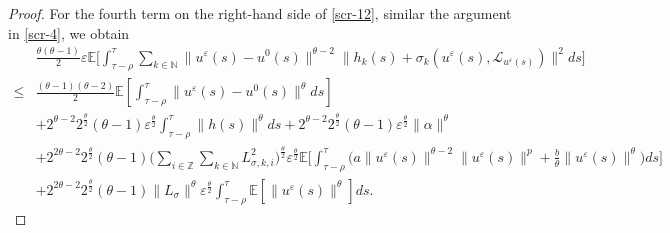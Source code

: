 \documentclass[11pt]{article}
\numberwithin{equation}{section}
\theoremstyle{plain}
\begin{document}
\begin{proof}
 For the fourth term on the right-hand side of \eqref{scr-12},
 similar the argument in \eqref{scr-4}, we obtain
 \begin{align}\label{scr-15}  
       & \frac{\theta(\theta - 1)}{2} \varepsilon \mathbb{E}
                  \bigg[ \int_{\tau-\rho}^{\tau} 
                              \sum_{k \in \mathbb{N} }
                                     \| u^{\varepsilon}(s) - u^0(s) \|^{\theta - 2}
                                     \| h_k(s) + \sigma_k(u^{\varepsilon}(s), \mathcal{L}_{u^{\varepsilon}(s)}) \|^2 ds
                  \bigg]  \nonumber\\ 
    \le & \frac{(\theta - 1)(\theta - 2)}{2}
                  \mathbb{E}
                         \left[ \int_{\tau-\rho}^{\tau} 
                                      \| u^{\varepsilon}(s) - u^0(s) \|^\theta
                                  ds
                         \right]  \nonumber\\   
         & + 2^{\theta -2} 2^{\frac{\theta}{2} } (\theta - 1) 
                   \varepsilon^{\frac{\theta}{2} } 
                      \int_{\tau-\rho}^{\tau} 
                                   \| h(s) \|^\theta
                       ds
             + 2^{\theta -2} 2^{\frac{\theta}{2} } (\theta - 1) 
                     \varepsilon^{\frac{\theta}{2} }  
                            \| \alpha \|^\theta  \nonumber\\   
         & + 2^{2\theta -2} 2^{\frac{\theta}{2} } (\theta - 1) 
                  \Big( \sum_{i \in \mathbb{Z} }
                                \sum_{k \in \mathbb{N} }                                     
                                      L_{\sigma, k,i}^2
                  \Big)^{\frac{\theta}{2} } 
                 \varepsilon^{\frac{\theta}{2} } 
                 \mathbb{E}
                       \bigg[ \int_{\tau-\rho}^{\tau} 
                                          \Big( a \|u^{\varepsilon}(s)\|^{\theta -2} \|u^{\varepsilon}(s)\|^p 
                                                   + \frac{b}{\theta} \|u^{\varepsilon}(s)\|^\theta
                                          \Big)        
                                      ds
                      \bigg]  \nonumber\\  
         & + 2^{2\theta -2} 2^{\frac{\theta}{2} } (\theta - 1) \|L_\sigma\|^\theta 
                  \varepsilon^{\frac{\theta}{2} }  
                     \int_{\tau-\rho}^{\tau} 
                              \mathbb{E} \left[ \|u^{\varepsilon}(s) \|^\theta \right]
                     ds.                  
 \end{align}
 

\end{proof}
\end{document}
